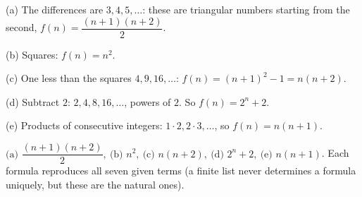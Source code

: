 (a) The differences are $3,4,5,\dots$: these are triangular numbers starting from the second, $f(n)=\dfrac{(n+1)(n+2)}{2}$.

(b) Squares: $f(n)=n^2$.

(c) One less than the squares $4,9,16,\dots$: $f(n)=(n+1)^2-1=n(n+2)$.

(d) Subtract $2$: $2,4,8,16,\dots$, powers of $2$. So $f(n)=2^n+2$.

(e) Products of consecutive integers: $1\cdot2,2\cdot3,\dots$, so $f(n)=n(n+1)$.

$\boxed{\text{(a) }\dfrac{(n+1)(n+2)}{2},\ \text{(b) }n^2,\ \text{(c) }n(n+2),\ \text{(d) }2^n+2,\ \text{(e) }n(n+1)}$. Each formula reproduces all seven given terms (a finite list never determines a formula uniquely, but these are the natural ones).
